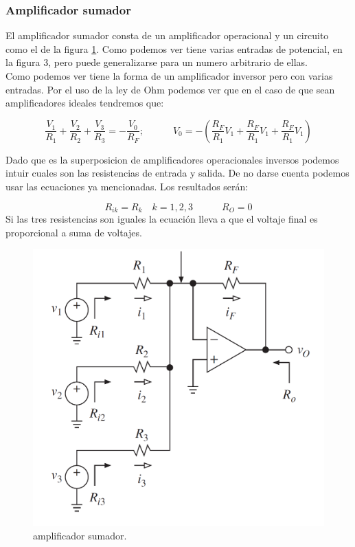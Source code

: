 \documentclass[12pt,a4paper]{article}
\numberwithin{equation}{section}
\numberwithin{figure}{section}
\newcommand{\parentesis}[1]{\left( #1  \right)}
\newcommand{\tquad}{\quad \quad \quad}
\begin{document}
\subsubsection{Amplificador sumador}

El amplificador sumador consta de un amplificador operacional y un circuito como el de la figura \ref{Fig:1.3.5.-Amplificador-Sumador}. Como podemos ver tiene varias entradas de potencial, en la figura 3, pero puede generalizarse para un numero arbitrario de ellas.\\

Como podemos ver tiene la forma de un amplificador inversor pero con varias entradas. Por el uso de la ley de Ohm podemos ver que en el caso de que sean amplificadores ideales tendremos que:

\begin{equation}
\dfrac{V_1}{R_1}+\dfrac{V_2}{R_2}+\dfrac{V_3}{R_3}=-\dfrac{V_0}{R_F}; \tquad V_0 = - \parentesis{\dfrac{R_F}{R_1}V_1+\dfrac{R_F}{R_1}V_1+\dfrac{R_F}{R_1}V_1}
\end{equation}

Dado que es la superposicion de amplificadores operacionales inversos podemos intuir cuales son las resistencias de entrada y salida. De no darse cuenta podemos usar las ecuaciones ya mencionadas. Los resultados serán:

\begin{equation}
R_{ik} = R_k \quad k =1,2,3 \tquad R_O=0
\end{equation}
Si las tres resistencias son iguales la ecuación lleva a que el voltaje final es proporcional a suma de voltajes.



\begin{figure}[h!] \centering
\includegraphics[scale=0.4]{1.5-Amplificador-sumador.png}
\caption{amplificador sumador.}
\label{Fig:1.3.5.-Amplificador-Sumador}
\end{figure} 
\end{document}
